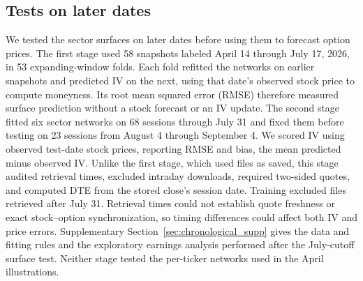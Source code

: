 \subsection{Tests on later dates}\label{sec:chronological_methods}

We tested the sector surfaces on later dates before using them to forecast option prices. The first stage used 58 snapshots labeled April 14 through July 17, 2026, in 53 expanding-window folds. Each fold refitted the networks on earlier snapshots and predicted IV on the next, using that date's observed stock price to compute moneyness. Its root mean squared error (RMSE) therefore measured surface prediction without a stock forecast or an IV update. The second stage fitted six sector networks on 68 sessions through July 31 and fixed them before testing on 23 sessions from August 4 through September 4. We scored IV using observed test-date stock prices, reporting RMSE and bias, the mean predicted minus observed IV. Unlike the first stage, which used files as saved, this stage audited retrieval times, excluded intraday downloads, required two-sided quotes, and computed DTE from the stored close's session date. Training excluded files retrieved after July 31. Retrieval times could not establish quote freshness or exact stock--option synchronization, so timing differences could affect both IV and price errors. Supplementary Section~\ref{sec:chronological_supp} gives the data and fitting rules and the exploratory earnings analysis performed after the July-cutoff surface test. Neither stage tested the per-ticker networks used in the April illustrations.

